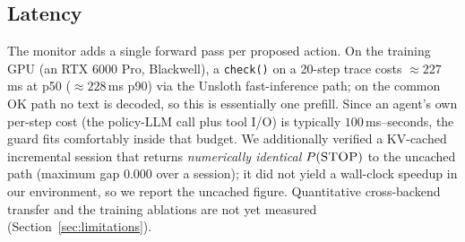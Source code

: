 \subsection{Latency}
\label{sec:experiments:latency}

The monitor adds a single forward pass per proposed action. On the training GPU
(an RTX 6000 Pro, Blackwell), a \texttt{check()} on a 20-step trace costs
$\approx 227$\,ms at p50 ($\approx 228$\,ms p90) via the Unsloth fast-inference
path; on the common \textsc{OK} path no text is decoded, so this is essentially
one prefill. Since an agent's own per-step cost (the policy-LLM call plus tool
I/O) is typically $100$\,ms--seconds, the guard fits comfortably inside that
budget. We additionally verified a KV-cached incremental session that returns
\emph{numerically identical} $P(\textsc{STOP})$ to the uncached path (maximum gap
$0.000$ over a session); it did not yield a wall-clock speedup in our
environment, so we report the uncached figure. Quantitative cross-backend
transfer and the training ablations are not yet measured
(Section~\ref{sec:limitations}).
